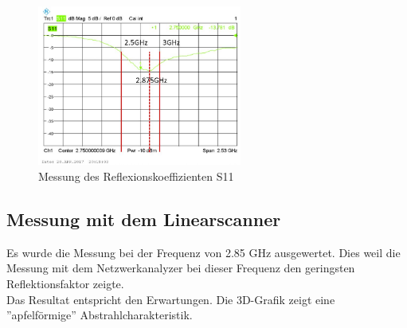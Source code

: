 \begin{figure}[htbp]
	\centering
	\includegraphics[width=0.6\textwidth]{pic/Messungen/Messung_S11_bea.JPG}
	\caption{Messung des Reflexionskoeffizienten S11}
	\label{fig:MessungS11}
\end{figure}

\newpage

\subsection{Messung mit dem Linearscanner}

Es wurde die Messung bei der Frequenz von 2.85 GHz ausgewertet. Dies weil die Messung mit dem Netzwerkanalyzer bei dieser Frequenz den geringsten Reflektionsfaktor zeigte.\\
Das Resultat entspricht den Erwartungen. Die 3D-Grafik zeigt eine ''apfelförmige'' Abstrahlcharakteristik.

